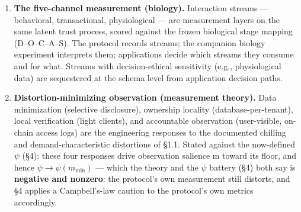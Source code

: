 \documentclass[
]{article}
\begin{document}
\begin{enumerate}
  with \(\lambda^{+}\), \(\lambda^{-}\) \(\geq 0\) the
  confirmation/betrayal sensitivities, \(r_t\) \(\in\) {[}0,1{]} the
  recognition gate, \(\delta_S\) \(\geq 0\) the retention leak, and
  \(S_{\mathrm{base}}\) the baseline; \(\varepsilon\) is dimensionless
  after per-domain normalization (\(\tilde{\varepsilon}\) = (V \(-\)
  \(E)/s_d\), \(s_d\) the RMSE of the domain's expectation distribution,
  companion theory preprint, Def. 2a). The named layer presets are: the
  physics layer (\(r = 1,\) \(\delta_S = 0,\)
  \(\lambda^{+} = \lambda^{-} = \lambda\) --- the Rescorla--Wagner
  limit, reducing exactly to \(\Delta S_t = \lambda (V_t\) \(-\)
  \(E_t\))); the biological layer (gating \(r_t\), baseline-restoring
  leak \(\delta_S > 0,\) \(S_{\mathrm{base}}\) the homeostatic prior);
  and the \textbf{TFP protocol layer (\(\lambda^{-} > \lambda^{+}\) ---
  break/build asymmetry: betrayal updates faster than confirmation
  accrues --- as an explicitly labeled extension)}, with
  \(r_t \equiv 1\) and \(\delta_S\) \(\geq 0.\) The protocol therefore
  treats validation as a primitive: a typed, timestamped, attributable
  event with an expectation field and an outcome field. Domains differ
  only in what fills those fields.
\item
  \textbf{The five-channel measurement (biology).} Interaction streams
  --- behavioral, transactional, physiological --- are measurement
  layers on the same latent trust process, scored against the frozen
  biological stage mapping (D--O--C--A--S). The protocol records
  streams; the companion biology experiment interprets them;
  applications decide which streams they consume and for what. Streams
  with decision-ethical sensitivity (e.g., physiological data) are
  sequestered at the schema level from application decision paths.
\item
  \textbf{Distortion-minimizing observation (measurement theory).} Data
  minimization (selective disclosure), ownership locality
  (database-per-tenant), local verification (light clients), and
  accountable observation (user-visible, on-chain access logs) are the
  engineering responses to the documented chilling and
  demand-characteristic distortions of §1.1. Stated against the
  now-defined \(\psi\) (§4): these four responses drive observation
  salience m toward its floor, and hence
  \(\psi \to \psi (m_{\mathrm{min}})\) --- which the theory and the
  \(\psi\) battery (§4) both say is \textbf{negative and nonzero}: the
  protocol's own measurement still distorts, and §4 applies a
  Campbell's-law caution to the protocol's own metrics accordingly.
\end{enumerate}
\end{document}
